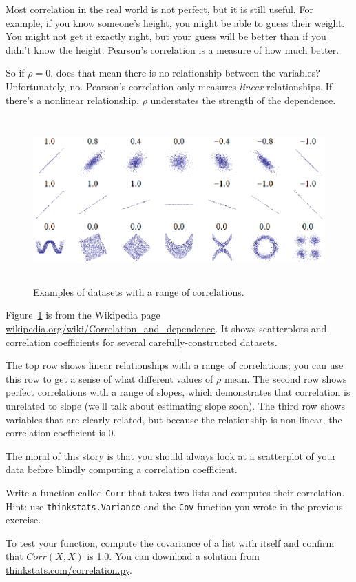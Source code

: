 \documentclass[12pt]{book}
\begin{document}
Most correlation in the real world is not perfect, but it
is still useful.  For example, if you know someone's height, you might
be able to guess their weight.  You might not get it exactly right, but
your guess will be better than if you didn't know the height.
Pearson's correlation is a measure of how much better.

So if $\rho=0$, does that mean there is no
relationship between the variables?  Unfortunately, no.  Pearson's
correlation only measures {\em linear} relationships.  If there's a
nonlinear relationship, $\rho$ understates the strength of the
dependence.

\begin{figure}
\centerline{\includegraphics[height=2.5in]{figs/Correlation_examples.eps}}
\caption{Examples of datasets with a range of correlations.}
\label{corr_examples}
\end{figure}

Figure~\ref{corr_examples} is from the Wikipedia page
\url{wikipedia.org/wiki/Correlation_and_dependence}.  It shows
scatterplots and correlation coefficients for several
carefully-constructed datasets.

The top row shows linear relationships with a range of correlations;
you can use this row to get a sense of what different values of $\rho$
mean.  The second row shows perfect correlations with a range of
slopes, which demonstrates that correlation is unrelated to slope
(we'll talk about estimating slope soon).  The third
row shows variables that are clearly related, but because the
relationship is non-linear, the correlation coefficient is 0.

The moral of this story is that you should always look at a scatterplot of
your data before blindly computing a correlation coefficient.

\begin{ex}

Write a function called {\tt Corr} that takes two lists and
computes their correlation.  Hint: use {\tt thinkstats.Variance} and
the {\tt Cov} function you wrote in the previous exercise.

To test your function, compute the covariance of a list with itself
and confirm that $Corr(X, X)$ is 1.0.  You can download a solution
from \url{thinkstats.com/correlation.py}.

\end{ex}
\end{document}

